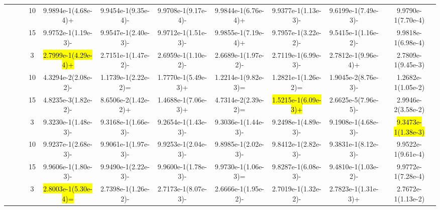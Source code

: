 \documentclass[a4paper,fleqn]{cas-dc}
\newcommand{\highlight}[1]{
	\begingroup
	\sethlcolor{Seashell}%
	\hl{#1}%
	\endgroup
}
\begin{document}
\begin{sloppypar}
\begin{table}[ht]
{\begin{tabular}{cccccccccc}
					\multirow{12}{*}{~}&\multirow{3}{*}{~} &10 &9.9894e-1(4.68e-4)+ &9.9454e-1(9.35e-4)-	&9.9708e-1(9.17e-4)-	&9.9844e-1(6.76e-4)+	&9.9377e-1(1.13e-3)-	&9.6199e-1(7.49e-3)-	&9.9790e-1(7.70e-4)\\
					
					\multirow{12}{*}{~}&\multirow{3}{*}{~} &15 &9.9752e-1(1.19e-3)-	&9.9547e-1(2.40e-3)-	&9.9712e-1(1.51e-3)-	&9.9855e-1(7.19e-4)+	&9.7957e-1(3.22e-2)-	&9.5415e-1(1.16e-2)-	&9.9818e-1(6.98e-4)\\
					
					
					
					
					\multirow{12}{*}{~}&\multirow{3}{*}{MaF7} &3  &\highlight{2.7999e-1(4.29e-4)+} 	&2.7151e-1(1.47e-2)-	&2.6959e-1(1.10e-2)-	&2.6689e-1(1.97e-2)-	&2.7119e-1(6.99e-3)-	&2.7812e-1(9.96e-4)+	&2.7809e-1(9.45e-3)\\ 
					
					\multirow{12}{*}{~}&\multirow{3}{*}{~} &10 &4.3294e-2(2.08e-2)-	&1.1739e-1(2.22e-2)=	&1.7770e-1(5.49e-3)+	&1.2214e-1(9.82e-3)=	&1.2821e-1(1.26e-2)=	&1.9045e-2(8.76e-3)-	&1.2682e-1(1.05e-2)\\
					
					\multirow{12}{*}{~}&\multirow{3}{*}{~} &15 &4.8235e-3(1.82e-2)-	&8.6506e-2(1.42e-2)+	&1.4688e-1(7.06e-3)+	&4.7314e-2(2.39e-2)=	&\highlight{1.5215e-1(6.09e-3)+}	&2.6625e-5(7.96e-5)-	&2.9946e-2(3.58e-2)\\
					
					
					
					
					
					\multirow{12}{*}{~}&\multirow{3}{*}{MaF11} &3 &9.3230e-1(1.48e-3)-	&9.3168e-1(1.66e-3)-	&9.2654e-1(1.43e-3)-	&9.3036e-1(1.44e-3)-	&9.2498e-1(4.89e-3)-	&9.1908e-1(4.68e-3)-	&\highlight{9.3473e-1(1.38e-3)}\\ 
					
					\multirow{12}{*}{~}&\multirow{3}{*}{~} &10	&9.9237e-1(2.68e-3)-	&9.9061e-1(1.97e-3)-	&9.9253e-1(2.04e-3)-	&9.8985e-1(2.02e-3)-	&9.8412e-1(2.82e-3)-	&9.3831e-1(8.12e-3)-	&9.9522e-1(9.61e-4)\\
					
					\multirow{12}{*}{~}&\multirow{3}{*}{~} &15 	&9.9606e-1(1.80e-3)-	&9.9490e-1(2.22e-3)-	&9.9600e-1(1.78e-3)-	&9.9730e-1(1.06e-3)=	&9.8287e-1(6.08e-3)-	&9.4810e-1(1.03e-2)-	&9.9772e-1(7.28e-4)\\
					
					
					
					
					\multirow{12}{*}{~}&\multirow{3}{*}{DTLZ7} &3 &\highlight{2.8003e-1(5.30e-4)=}	&2.7398e-1(1.26e-2)-	&2.7173e-1(8.07e-3)-	&2.6666e-1(1.95e-2)-	&2.7019e-1(1.32e-2)-	&2.7823e-1(1.31e-3)+	&2.7672e-1(1.13e-2)\\ 
					

\end{tabular}}
\end{table}
\end{sloppypar}
\end{document}
